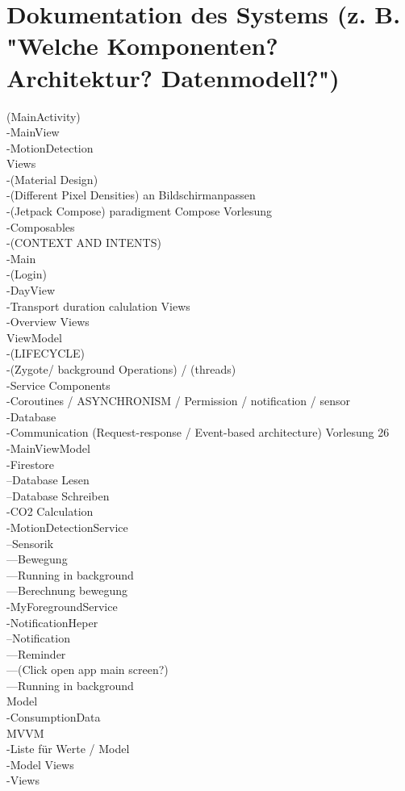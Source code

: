 \documentclass[a4paper,11pt]{article}
\begin{document}
\section{Dokumentation des Systems (z. B. "Welche Komponenten? Architektur? Datenmodell?")}
(MainActivity)\\
	-MainView \\
	-MotionDetection\\
Views\\
	-(Material Design)\\
	-(Different Pixel Densities) an Bildschirmanpassen\\
	-(Jetpack Compose) paradigment Compose Vorlesung\\
	-Composables\\
	-(CONTEXT AND INTENTS)\\
	-Main\\
	-(Login)\\
	-DayView\\
	-Transport duration calulation Views\\
	-Overview Views\\
ViewModel\\
	-(LIFECYCLE)\\
	-(Zygote/ background Operations) / (threads)\\
	-Service Components\\
	-Coroutines / ASYNCHRONISM / Permission / notification / sensor\\
	-Database\\
	-Communication (Request-response / Event-based architecture) Vorlesung 26\\
	-MainViewModel\\
	-Firestore\\
		--Database Lesen\\
		--Database Schreiben\\
	-CO2 Calculation\\
	-MotionDetectionService\\
		--Sensorik\\
			---Bewegung\\
			---Running in background\\
			---Berechnung bewegung\\
	-MyForegroundService\\
	-NotificationHeper\\
		--Notification\\
			---Reminder\\
			---(Click open app main screen?)\\
			---Running in background\\
Model\\
	-ConsumptionData\\
MVVM\\
	-Liste für Werte / Model\\
	-Model Views\\
	-Views\\
\end{document}
